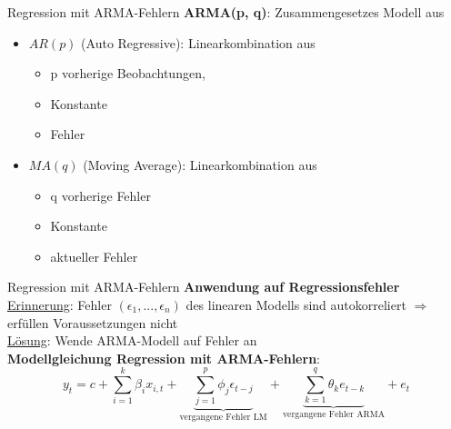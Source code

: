 \begin{frame}{Regression mit ARMA-Fehlern}
	\textbf{ARMA(p, q)}: Zusammengesetzes Modell aus\\
	\begin{itemize}
		\item $AR(p)$ (Auto Regressive): Linearkombination aus
		\begin{itemize}
			\item p vorherige Beobachtungen, 
			\item Konstante
			\item Fehler
		\end{itemize}
		\item $MA(q)$ (Moving Average): Linearkombination aus
		\begin{itemize}
			\item q vorherige Fehler
			\item Konstante
			\item aktueller Fehler
		\end{itemize}
	\end{itemize}
\end{frame}

\begin{frame}{Regression mit ARMA-Fehlern}
	\textbf{Anwendung auf Regressionsfehler} \\
	\underline{Erinnerung}: Fehler $(\epsilon_1,...,\epsilon_n)$ des linearen Modells sind autokorreliert $\Rightarrow$ erfüllen Voraussetzungen nicht\\
	\underline{Lösung}: Wende ARMA-Modell auf Fehler an \\
	\textbf{Modellgleichung Regression mit ARMA-Fehlern}:
	$$y_t = c + \sum_{i=1}^{k}{\beta_i x_{i,t}} + \underbrace{\sum_{j=1}^{p}{\phi_j\epsilon_{t-j}}}_{\text{vergangene Fehler LM}} + \underbrace{\sum_{k=1}^{q}{\theta_k e_{t-k}}}_{\text{vergangene Fehler ARMA}} + e_t$$
	
\end{frame}


